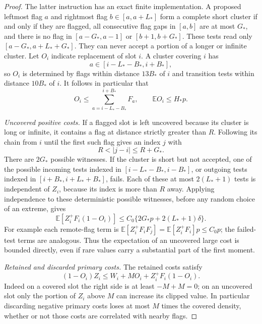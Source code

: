 \begin{proof}
The latter instruction has an exact finite implementation. A proposed
leftmost flag $a$ and rightmost flag $b\in[a,a+L_*]$ form a complete
short cluster if and only if they are flagged, all consecutive flag
gaps in $[a,b]$ are at most $G_*$, and there is no flag in
$[a-G_*,a-1]$ or $[b+1,b+G_*]$. These tests read only
$[a-G_*,a+L_*+G_*]$. They can never accept a portion of a longer or
infinite cluster. Let $O_i$ indicate replacement of slot $i$. A cluster
covering $i$ has
\[
 a\in[i-L_*-B_*,i+B_*],
\]
so $O_i$ is determined by flags within distance $13B_*$ of $i$ and
transition tests within distance $10B_*$ of $i$. It follows in particular
that
\begin{equation}
 O_i\leq\sum_{a=i-L_*-B_*}^{i+B_*}F_a,
 \qquad \mathbb EO_i\leq H_*p.
 \label{improvement:flags:eq4}
\end{equation}

\emph{Uncovered positive costs.}
If a flagged slot is left uncovered because
its cluster is long or infinite, it contains a flag at distance
strictly greater than $R$. Following its chain from $i$ until the first
such flag gives an index $j$ with
\[
 R<|j-i|\leq R+G_*.
\]
There are $2G_*$ possible witnesses. If the cluster is short but not
accepted, one of the possible incoming tests indexed in
$[i-L_*-B_*,i-B_*]$, or outgoing tests indexed in
$[i+B_*,i+L_*+B_*]$, fails. Each of these at most $2(L_*+1)$ tests is
independent of $Z_i$, because its index is more than $R$ away. Applying
independence to these deterministic possible witnesses, before any
random choice of an extreme, gives
\begin{equation}
 \mathbb E[Z_i^+F_i(1-O_i)]
 \leq C_0\{2G_*p+2(L_*+1)\delta\}.
 \label{improvement:flags:eq5}
\end{equation}
For example each remote-flag term is
$\mathbb E[Z_i^+F_iF_j]=\mathbb E[Z_i^+F_i]p\leq C_0p$;
the failed-test terms are analogous. Thus the expectation of an
uncovered large cost is bounded directly, even if rare values carry a
substantial part of the first moment.

\emph{Retained and discarded primary costs.}
The retained costs satisfy
\begin{equation}
 (1-O_i)Z_i\leq W_i+MO_i+Z_i^+F_i(1-O_i).
 \label{improvement:flags:eq6}
\end{equation}
Indeed on a covered slot the right side is at least $-M+M=0$;
on an uncovered slot only the portion of $Z_i$ above $M$ can increase
its clipped value. In particular discarding negative primary costs
loses at most $M$ times the covered density, whether or not those
costs are correlated with nearby flags.


\end{proof}
